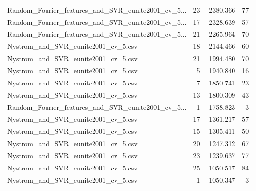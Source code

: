 \begin{tabularx}{\textwidth}{lrrr}
Random\_Fourier\_features\_and\_SVR\_eunite2001\_cv\_5... &       23 &  2380.366 &            77 \\
Random\_Fourier\_features\_and\_SVR\_eunite2001\_cv\_5... &       17 &  2328.639 &            57 \\
Random\_Fourier\_features\_and\_SVR\_eunite2001\_cv\_5... &       21 &  2265.964 &            70 \\
               Nystrom\_and\_SVR\_eunite2001\_cv\_5.csv &       18 &  2144.466 &            60 \\
               Nystrom\_and\_SVR\_eunite2001\_cv\_5.csv &       21 &  1994.480 &            70 \\
               Nystrom\_and\_SVR\_eunite2001\_cv\_5.csv &        5 &  1940.840 &            16 \\
               Nystrom\_and\_SVR\_eunite2001\_cv\_5.csv &        7 &  1850.741 &            23 \\
               Nystrom\_and\_SVR\_eunite2001\_cv\_5.csv &       13 &  1800.309 &            43 \\
Random\_Fourier\_features\_and\_SVR\_eunite2001\_cv\_5... &        1 &  1758.823 &             3 \\
               Nystrom\_and\_SVR\_eunite2001\_cv\_5.csv &       17 &  1361.217 &            57 \\
               Nystrom\_and\_SVR\_eunite2001\_cv\_5.csv &       15 &  1305.411 &            50 \\
               Nystrom\_and\_SVR\_eunite2001\_cv\_5.csv &       20 &  1247.312 &            67 \\
               Nystrom\_and\_SVR\_eunite2001\_cv\_5.csv &       23 &  1239.637 &            77 \\
               Nystrom\_and\_SVR\_eunite2001\_cv\_5.csv &       25 &  1050.517 &            84 \\
               Nystrom\_and\_SVR\_eunite2001\_cv\_5.csv &        1 & -1050.347 &             3 \\
\bottomrule
\end{tabularx}
